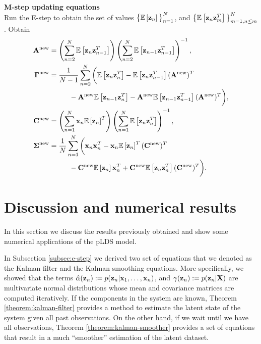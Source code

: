 \documentclass[11pt]{article}
\numberwithin{equation}{section}
\newcommand{\expectation}[1]{\mathbb{E}\left[#1\right]}
\newcommand{\x}{{\bf x}}
\newcommand{\z}{{\bf z}}
\begin{document}
\begin{tcolorbox}
\textbf{M-step updating equations}\\
	Run the E-step to obtain the set of values $\big\{\expectation{\z_n}\big\}_{n=1}^N$, and $\big\{\expectation{\z_n\z_m^T}\big\}_{m=1, n\leq m}^N$ . Obtain
	\begin{align}
		{\bf A}^{\text{\normalfont new}} &= \left(\sum_{n=2}^N \expectation{\z_n \z_{n-1}^T}\right)\left(\sum_{n=2}^N \expectation{\z_{n-1}\z_{n-1}^T}\right)^{-1} \label{eq:mstep-A-final},\\
		\boldsymbol{\Gamma}^{\text{\normalfont new}} &= \frac{1}{N-1}\sum_{n=2}^N\bigg( \expectation{\z_n \z_n^T} - \expectation{\z_n \z_{n-1}^T}({\bf A}^{\text{\normalfont new}})^T \nonumber\\
		&\hspace{1cm} - {\bf A}^{\text{\normalfont new}}\expectation{\z_{n-1}\z_n^T} - {\bf A}^{\text{\normalfont new}}\expectation{\z_{n-1} \z_{n-1}^T}({\bf A}^{\text{\normalfont new}})^T \bigg), \label{eq:mstep-Gamma-final}\\
		{\bf C}^{\text{\normalfont new}} &= \left(\sum_{n=1}^N \x_n \expectation{\z_n}^T \right)\left(\sum_{n=1}^N \expectation{\z_n \z_n^T} \right)^{-1}, \label{eq:mstep-C-final}\\
		\boldsymbol{\Sigma}^{\text{\normalfont new}} &= \frac{1}{N}\sum_{n=1}^N\bigg(\x_n\x_n^T - \x_n \expectation{\z_n}^T ({\bf C}^{\text{\normalfont new}})^T \nonumber\\
		&\hspace{1cm} - {\bf C}^{\text{\normalfont new}}\expectation{\z_n}\x_n^T + {\bf C}^{\text{\normalfont new}} \expectation{\z_n \z_n^T}({\bf C}^{\text{\normalfont new}})^T \bigg). \label{eq:mstep-Sigma-final}
	\end{align}
\end{tcolorbox}

\section{Discussion and numerical results}
In this section we discuss the results previously obtained and show some numerical applications of the pLDS model.

In Subsection \ref{subsec:e-step} we derived two set of equations that we denoted as the Kalman filter and the Kalman smoothing equations. More specifically, we showed that the terms $\hat\alpha(\z_n) := p(\z_n \vert \x_1, \ldots, \x_n)$, and $\gamma(\z_n) := p(\z_n\vert {\bf X})$ are multivariate normal distributions whose mean and covariance matrices are computed iteratively. If the components in the system are known, Theorem \ref{theorem:kalman-filter} provides a method to estimate the latent state of the system given all past observations. On the other hand, if we wait until we have all observations, Theorem \ref{theorem:kalman-smoother} provides a set of equations that result in a much ``smoother'' estimation of the latent dataset.
\end{document}
